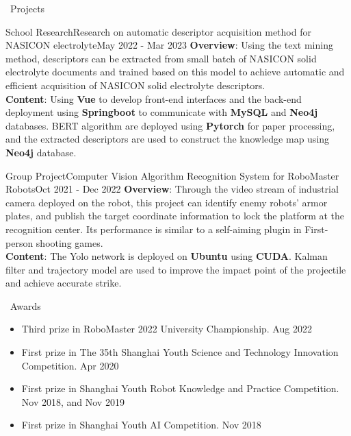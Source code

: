 \documentclass[UTF8]{resume}
\begin{document}
\begin{rSection}{\faUsers~Projects}

    \begin{rProject}{School Research}{Research on automatic descriptor acquisition method for NASICON electrolyte}{May 2022 - Mar 2023}
        \textbf{Overview}: Using the text mining method, descriptors can be extracted from small batch of NASICON solid electrolyte documents and trained based on this model to achieve automatic and efficient acquisition of NASICON solid electrolyte descriptors.\\
        \textbf{Content}: Using \textbf{Vue} to develop front-end interfaces and the back-end deployment using \textbf{Springboot} to communicate with \textbf{MySQL} and \textbf{Neo4j} databases. BERT algorithm are deployed using \textbf{Pytorch} for paper processing, and the extracted descriptors are used to construct the knowledge map using \textbf{Neo4j} database.
    \end{rProject}

    \begin{rProject}{Group Project}{Computer Vision Algorithm Recognition System for RoboMaster Robots}{Oct 2021 - Dec 2022}
        \textbf{Overview}: Through the video stream of industrial camera deployed on the robot, this project can identify enemy robots' armor plates, and publish the target coordinate information to lock the platform at the recognition center. Its performance is similar to a self-aiming plugin in First-person shooting games.\\
        \textbf{Content}: The Yolo network is deployed on \textbf{Ubuntu} using \textbf{CUDA}. Kalman filter and trajectory model are used to improve the impact point of the projectile and achieve accurate strike.
    \end{rProject}

\end{rSection}

\begin{rSection}{\faAward~Awards}
    \begin{itemize}
        \itemsep -0.5em
        \item Third prize in RoboMaster 2022 University Championship. \hfill Aug 2022
        \item First prize in The 35th Shanghai Youth Science and Technology Innovation Competition. \hfill Apr 2020
        \item First prize in Shanghai Youth Robot Knowledge and Practice Competition. \hfill Nov 2018, and Nov 2019
        \item First prize in Shanghai Youth AI Competition. \hfill Nov 2018
    \end{itemize}
\end{rSection}
\end{document}
